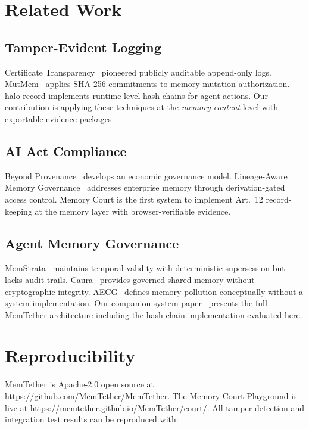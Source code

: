 \documentclass{article}
\begin{document}
\section{Related Work}

\subsection{Tamper-Evident Logging}

Certificate Transparency~\cite{ct} pioneered publicly auditable append-only logs. MutMem~\cite{mutmem} applies SHA-256 commitments to memory mutation authorization. halo-record implements runtime-level hash chains for agent actions. Our contribution is applying these techniques at the \emph{memory content} level with exportable evidence packages.

\subsection{AI Act Compliance}

Beyond Provenance~\cite{beyondprovenance} develops an economic governance model. Lineage-Aware Memory Governance~\cite{lineage} addresses enterprise memory through derivation-gated access control. Memory Court is the first system to implement Art.~12 record-keeping at the memory layer with browser-verifiable evidence.

\subsection{Agent Memory Governance}

MemStrata~\cite{memstrata} maintains temporal validity with deterministic supersession but lacks audit trails. Caura~\cite{caura} provides governed shared memory without cryptographic integrity. AECG~\cite{aecg} defines memory pollution conceptually without a system implementation. Our companion system paper~\cite{routec} presents the full MemTether architecture including the hash-chain implementation evaluated here.

\section{Reproducibility}
\label{sec:repro}

MemTether is Apache-2.0 open source at \url{https://github.com/MemTether/MemTether}. The Memory Court Playground is live at \url{https://memtether.github.io/MemTether/court/}. All tamper-detection and integration test results can be reproduced with:
\end{document}
